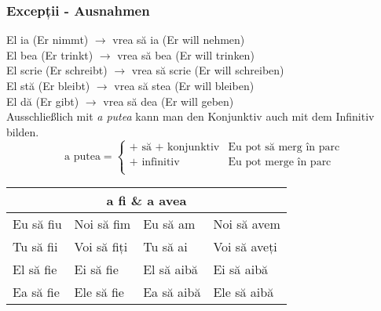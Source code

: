 \documentclass[11pt, oneside]{article}
\begin{document}
\subsubsection{Excepții - Ausnahmen}
El ia (Er nimmt) $\rightarrow$ vrea să ia (Er will nehmen)\\
El bea (Er trinkt) $\rightarrow$ vrea să bea (Er will trinken)\\
El scrie (Er schreibt) $\rightarrow$ vrea să scrie (Er will schreiben)\\
El stă (Er bleibt) $\rightarrow$ vrea să stea (Er will bleiben)\\
El dă (Er gibt) $\rightarrow$ vrea să dea (Er will geben)\\
\newline
Ausschließlich mit \emph{a putea} kann man den Konjunktiv auch mit dem Infinitiv bilden. 
\begin{equation*}
  \text{a putea} =
  \begin{cases}
    \text{+ să + konjunktiv} & \text{Eu pot să merg în parc} \\
    \text{+ infinitiv} & \text{Eu pot merge în parc}\\
  \end{cases}
\end{equation*}

\begin{center}
  \begin{tabular}{ |p{3.25cm}|p{3.25cm}||p{3.25cm}|p{3.25cm}|  }
      \hline  
      \multicolumn{4}{|c|}{a fi \& a avea} \\
      \hline
      \hline
      Eu să fiu & Noi să fim & Eu să am & Noi să avem\\
      \hline
      Tu să fii & Voi să fiți & Tu să ai & Voi să aveți\\
      \hline
      El să fie& Ei să fie & El să aibă & Ei să aibă\\ 
      Ea să fie& Ele să fie & Ea să aibă & Ele să aibă\\
      \hline
     \end{tabular}
\end{center}

%
\end{document}
